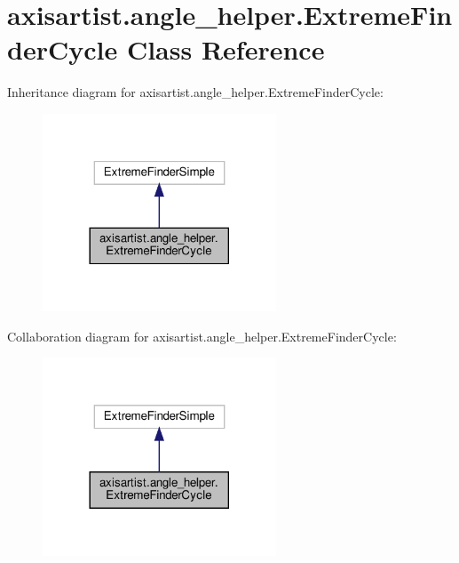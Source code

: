 \hypertarget{classaxisartist_1_1angle__helper_1_1ExtremeFinderCycle}{}\section{axisartist.\+angle\+\_\+helper.\+Extreme\+Finder\+Cycle Class Reference}
\label{classaxisartist_1_1angle__helper_1_1ExtremeFinderCycle}


Inheritance diagram for axisartist.\+angle\+\_\+helper.\+Extreme\+Finder\+Cycle\+:
\nopagebreak
\begin{figure}[H]
\begin{center}
\leavevmode
\includegraphics[width=197pt]{classaxisartist_1_1angle__helper_1_1ExtremeFinderCycle__inherit__graph}
\end{center}
\end{figure}


Collaboration diagram for axisartist.\+angle\+\_\+helper.\+Extreme\+Finder\+Cycle\+:
\nopagebreak
\begin{figure}[H]
\begin{center}
\leavevmode
\includegraphics[width=197pt]{classaxisartist_1_1angle__helper_1_1ExtremeFinderCycle__coll__graph}
\end{center}
\end{figure}
